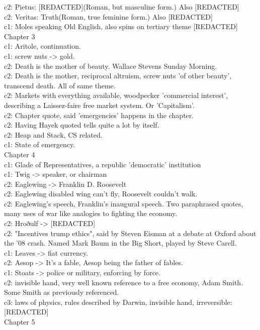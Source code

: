 c2: Pietus: [REDACTED](Roman, but masculine form.) Also [REDACTED]\\
c2: Veritas: Truth(Roman, true feminine form.) Also [REDACTED]\\
c1: Moles speaking Old English, also spins on tertiary theme [REDACTED]\\
Chapter 3\\[0.1cm]
c1: Aritole, continuation.\\
c1: screw nuts -> gold.\\
c2: Death is the mother of beauty. Wallace Stevens Sunday Morning.\\
c2: Death is the mother, reciprocal altruism, screw nuts 'of other beauty', transcend death. All of same theme.\\
c2: Markets with everything available, woodpecker 'commercial interest', describing a Laissez-faire free market system. Or 'Capitalism'.\\
c2: Chapter quote, said 'emergencies' happens in the chapter.\\
c2: Having Hayek quoted tells quite a lot by itself.\\
c2: Heap and Stack, CS related.\\
c1: State of emergency.\\
Chapter 4\\[0.1cm]
c1: Glade of Representatives, a republic 'democratic' institution\\
c1: Twig -> speaker, or chairman\\
c2: Eaglewing -> Franklin D. Roosevelt\\
c2: Eaglewing disabled wing can't fly, Roosevelt couldn't walk.\\
c2: Eaglewing's speech, Franklin's inaugural speech. Two paraphrased quotes, many uses of war like analogies to fighting the economy.\\
c2: Hroðulf -> [REDACTED]\\
c2: "Incentives trump ethics", said by Steven Eisman at a debate at Oxford about the '08 crash. Named Mark Baum in the Big Short, played by Steve Carell.\\
c1: Leaves -> fiat currency.\\
c2: Aesop -> It's a fable, Aesop being the father of fables.\\
c1: Stoats -> police or military, enforcing by force.\\
c2: invisible hand, very well known reference to a free economy, Adam Smith. Some Smith as previously referenced.\\
c3: laws of physics, rules described by Darwin, invisible hand, irreversible: [REDACTED]\\
Chapter 5\\[0.1cm]

